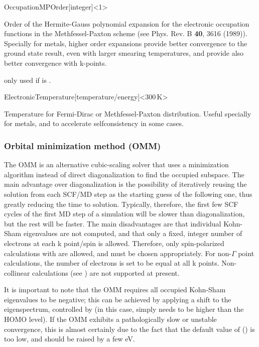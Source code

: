 \begin{fdfentry}{OccupationMPOrder}[integer]<1>
  
  Order of the Hermite-Gauss polynomial expansion for the electronic
  occupation functions in the Methfessel-Paxton scheme (see
  Phys. Rev. B \textbf{40}, 3616 (1989)).  Specially for metals,
  higher order expansions provide better convergence to the ground
  state result, even with larger smearing temperatures, and provide
  also better convergence with k-points.

  \note only used if  is .

\end{fdfentry}


\begin{fdfentry}{ElectronicTemperature}[temperature/energy]<$300\,\mathrm{K}$>
  
  Temperature for Fermi-Dirac or Methfessel-Paxton
  distribution. Useful specially for metals, and to accelerate
  selfconsistency in some cases.

\end{fdfentry}



\subsubsection{Orbital minimization method (OMM)}
\label{SolverOMM}

The OMM is an alternative cubic-scaling solver that uses a
minimization algorithm instead of direct diagonalization to find the
occupied subspace.  The main advantage over diagonalization is the
possibility of iteratively reusing the solution from each SCF/MD step
as the starting guess of the following one, thus greatly reducing the
time to solution. Typically, therefore, the first few SCF cycles of
the first MD step of a simulation will be slower than diagonalization,
but the rest will be faster. The main disadvantages are that
individual Kohn-Sham eigenvalues are not computed, and that only a
fixed, integer number of electrons at each k point/spin is
allowed. Therefore, only spin-polarized calculations with
 are allowed, and  must be chosen
appropriately. For non-$\Gamma$ point calculations, the number of
electrons is set to be equal at all k points. Non-collinear
calculations (see ) are not supported at present.

It is important to note that the OMM requires all occupied Kohn-Sham
eigenvalues to be negative; this can be achieved by applying a shift
to the eigenspectrum, controlled by  (in this case,
 simply needs to be higher than the HOMO level). If the
OMM exhibits a pathologically slow or unstable convergence, this is
almost certainly due to the fact that the default value of
 () is too low, and should be raised by
a few eV.

